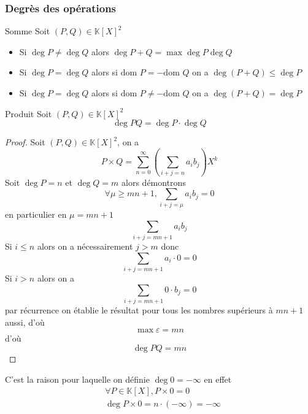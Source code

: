 \documentclass[11pt,colorlinks]{book}
\theoremstyle{mytheoremstyle}
\theoremstyle{mytheoremstyle}
\theoremstyle{mytheoremstyle}
\theoremstyle{mytheoremstyle}
\theoremstyle{mytheoremstyle}
\theoremstyle{mytheoremstyle}
\theoremstyle{mytheoremstyle}
\theoremstyle{mytheoremstyle}
\theoremstyle{myproblemstyle}
\def\mbb#1{\mathbb{#1}}
\def\bK{\mbb{K}}
\def\dom{\text{dom }}
\begin{document}
\subsubsection{Degrès des opérations}
  \begin{prop}{Somme}
    Soit $(P,Q) \in \bK[X]^2$ 
    \begin{itemize}
      \item Si $\deg P \not= \deg Q$ alors $\deg P+Q = \max \deg P \deg Q$
      \item Si $\deg P = \deg Q$ alors si $\text{dom }P = -\text{dom }Q$ on a $\deg (P+Q) \leq \deg P$
      \item Si $\deg P = \deg Q$ alors si $\dom P \not= -\dom Q$ on a $\deg (P+Q) = \deg P$
    \end{itemize}
  \end{prop}
  \begin{prop}{Produit}
    Soit $(P,Q) \in \bK[X]^2$ 
    \begin{equation*}
      \deg PQ = \deg P \cdot \deg Q
    \end{equation*}
    \begin{proof}
      Soit $(P,Q) \in \bK[X]^2$, on a 
      \begin{equation*}
        P\times Q = \sum_{n=0}^{\infty} \left(\sum_{i+j=n} a_i b_j\right) X^k
      \end{equation*}
      Soit $\deg P = n$ et $\deg Q = m$ alors démontrons
      \begin{equation*}
        \forall \mu \geq mn + 1, \sum_{i+j=\mu} a_i b_j = 0
      \end{equation*}
      en particulier en $\mu = mn + 1$ 
      \begin{equation*}
        \sum_{i+j=mn+1} a_i b_j
      \end{equation*}
      Si $i \leq n$ alors on a nécessairement $j > m$ donc 
      \begin{equation*}
        \sum_{i+j=mn+1} a_i \cdot 0 = 0
      \end{equation*}
      Si $i > n$ alors on a 
      \begin{equation*}
        \sum_{i+j=mn+1} 0 \cdot b_j = 0
      \end{equation*}
      par récurrence on établie le résultat pour tous les nombres supérieurs à $mn+1$ aussi, d'où 
      \begin{equation*}
        \max \varepsilon = mn
      \end{equation*}
      d'où
      \begin{equation*}
        \deg PQ = mn
      \end{equation*}
    \end{proof}
    \end{prop}
  \begin{rmq}
    C'est la raison pour laquelle on définie $\deg 0 = -\infty$ en effet 
    \begin{align*}
      &\forall P \in \bK[X], P\times 0 = 0 \\ 
      &\deg P\times 0 = n \cdot (-\infty) = -\infty
    \end{align*}
  \end{rmq}
\end{document}
